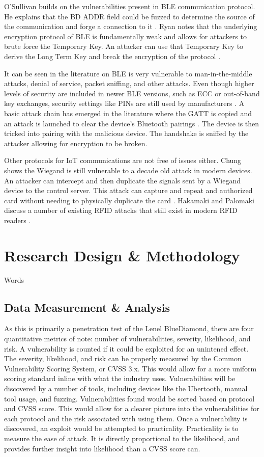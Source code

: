 \documentclass[10pt,twocolumn,letterpaper]{article}
\begin{document}
O'Sullivan builds on the vulnerabilities present in BLE communication protocol. He explains that the BD ADDR field could be fuzzed to determine the source of the communication and forge a connection to it \cite{osullivan}. Ryan notes that the underlying encryption protocol of BLE is fundamentally weak and allows for attackers to brute force the Temporary Key. An attacker can use that Temporary Key to derive the Long Term Key and break the encryption of the protocol \cite{mryan13}.

It can be seen in the literature on BLE is very vulnerable to man-in-the-middle attacks, denial of service, packet sniffing, and other attacks. Even though higher levels of security are included in newer BLE versions, such as ECC or out-of-band key exchanges, security settings like PINs are still used by manufacturers \cite{8622000}\cite{jaihc19}\cite{mryan13}. A basic attack chain has emerged in the literature where the GATT is copied and an attack is launched to clear the device's Bluetooth pairings \cite{jaihc19}. The device is then tricked into pairing with the malicious device. The handshake is sniffed by the attacker allowing for encryption to be broken. 

Other protocols for IoT communications are not free of issues either. Chung shows the Wiegand is still vulnerable to a decade old attack in modern devices. An attacker can intercept and then duplicate the signals sent by a Wiegand device to the control server. This attack can capture and repeat and authorized card without needing to physically duplicate the card \cite{chung2017wiegand}. Hakamaki and Palomaki discuss a number of existing RFID attacks that still exist in modern RFID readers \cite{rfid15}.

\section{Research Design \& Methodology}
Words

\subsection{Data Measurement \& Analysis}
As this is primarily a penetration test of the Lenel BlueDiamond, there are four quantitative metrics of note: number of vulnerabilities, severity, likelihood, and risk. A vulnerability is counted if it could be exploited for an unintened effect. The severity, likelihood, and risk can be properly measured by the Common Vulnerability Scoring System, or CVSS 3.x. This would allow for a more uniform scoring standard inline with what the industry uses. Vulnerabilties will be discovered by a number of tools, including devices like the Ubertooth, manual tool usage, and fuzzing. Vulnerabilities found would be sorted based on protocol and CVSS score. This would allow for a clearer picture into the vulnerabilities for each protocol and the risk associated with using them. Once a vulnerability is discovered, an exploit would be attempted to practicality. Practicality is to measure the ease of attack. It is directly proportional to the likelihood, and provides further insight into likelihood than a CVSS score can. 
\end{document}
